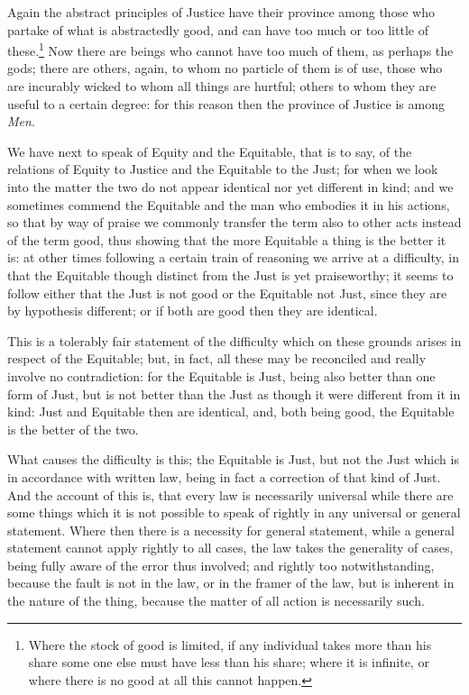 Again the abstract principles of Justice have their province among those who
partake of what is abstractedly good, and can have too much or too little of
these.\footnote{Where the stock of good is limited, if any individual takes more than his share
some one else must have less than his share; where it is infinite, or where
there is no good at all this cannot happen.}
Now there are beings who cannot have too much of them, as perhaps the gods;
there are others, again, to whom no particle of them is of use, those who are
incurably wicked to whom all things are hurtful; others to whom they are useful
to a certain degree: for this reason then the province of Justice is among
\emph{Men}.


We have next to speak of Equity and the Equitable, that is to say, of the
relations of Equity to Justice and the Equitable to the Just; for when we look
into the matter the two do not appear identical nor yet different in kind; and
we sometimes commend the Equitable and the man who embodies it in his actions,
so that by way of praise we commonly transfer the term also to other acts
instead of the term good, thus showing that the more Equitable a thing is the
better it is: at other times following a certain train of reasoning we arrive
at a difficulty, in that the Equitable though distinct from the Just is yet
praiseworthy; it seems to follow either that the Just is not good or the
Equitable not Just, since they are by hypothesis different; or if both are good
then they are identical.

This is a tolerably fair statement of the difficulty which on these grounds
arises in respect of the Equitable; but, in fact, all these may be reconciled
and really involve no contradiction: for the Equitable is Just, being also
better than one form of Just, but is not better than the Just as though it were
different from it in kind: Just and Equitable then are identical, and, both
being good, the Equitable is the better of the two.

What causes the difficulty is this; the Equitable is Just, but not the Just
which is in accordance with written law, being in fact a correction of that
kind of Just. And the account of this is, that every law is necessarily
universal while there are some things which it is not possible to speak of
rightly in any universal or general statement. Where then there is a necessity
for general statement, while a general statement cannot apply rightly to all
cases, the law takes the generality of cases, being fully aware of the error
thus involved; and rightly too notwithstanding, because the fault is not in the
law, or in the framer of the law, but is inherent in the nature of the thing,
because the matter of all action is necessarily such.

